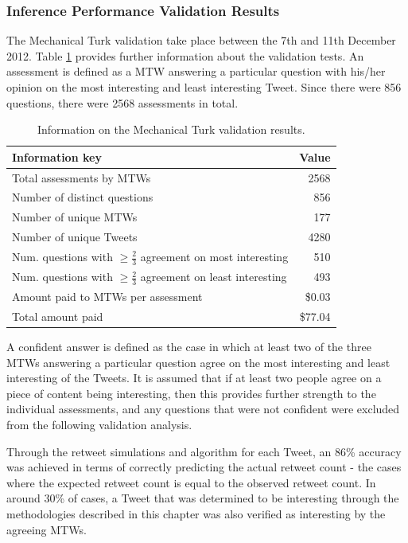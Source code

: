 \subsubsection{Inference Performance Validation Results}
The Mechanical Turk validation take place between the 7th and 11th December 2012. Table \ref{table:mtk_data_1} provides further information about the validation tests. An assessment is defined as a MTW answering a particular question with his/her opinion on the most interesting and least interesting Tweet. Since there were 856 questions, there were 2568 assessments in total.

\begin{table}[h]\footnotesize
\begin{center}
\begin{tabular}{ l || r }
     Information key & Value\\
     \hline
     \hline
	 Total assessments by MTWs & 2568\\
	 Number of distinct questions & 856\\
	 Number of unique MTWs & 177\\
	 Number of unique Tweets & 4280\\
	 \hline
	 Num. questions with $\geq \frac{2}{3}$ agreement on most interesting & 510\\
	 Num. questions with $\geq \frac{2}{3}$ agreement on least interesting & 493\\
	 \hline
	 Amount paid to MTWs per assessment & \$0.03\\
	 Total amount paid & \$77.04\\
     \hline
\end{tabular}
\end{center}
\caption{Information on the Mechanical Turk validation results.}
\label{table:mtk_data_1}
\end{table}

A confident answer is defined as the case in which at least two of the three MTWs answering a particular question agree on the most interesting and least interesting of the Tweets. It is assumed that if at least two people agree on a piece of content being interesting, then this provides further strength to the individual assessments, and any questions that were not confident were excluded from the following validation analysis.

Through the retweet simulations and algorithm for each Tweet, an 86\% accuracy was achieved in terms of correctly predicting the actual retweet count - the cases where the expected retweet count is equal to the observed retweet count. In around 30\% of cases, a Tweet that was determined to be interesting through the methodologies described in this chapter was also verified as interesting by the agreeing MTWs.

